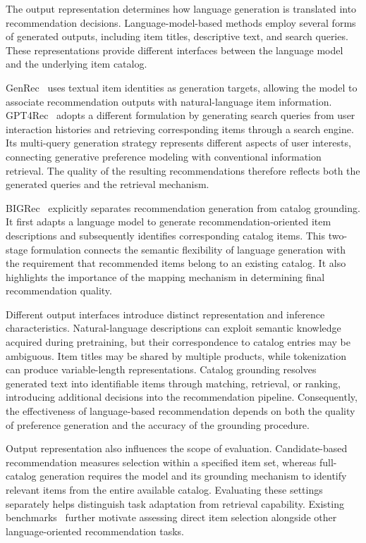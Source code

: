 \documentclass[sigconf,nonacm]{acmart}
\begin{document}
The output representation determines how language generation
is translated into recommendation decisions. Language-model-based
methods employ several forms of generated outputs, including
item titles, descriptive text, and search queries. These
representations provide different interfaces between the
language model and the underlying item catalog.

GenRec~\cite{genrec} uses textual item identities as generation
targets, allowing the model to associate recommendation outputs
with natural-language item information. GPT4Rec~\cite{gpt4rec}
adopts a different formulation by generating search queries
from user interaction histories and retrieving corresponding
items through a search engine. Its multi-query generation
strategy represents different aspects of user interests,
connecting generative preference modeling with conventional
information retrieval. The quality of the resulting
recommendations therefore reflects both the generated queries
and the retrieval mechanism.

BIGRec~\cite{bigrec} explicitly separates recommendation
generation from catalog grounding. It first adapts a language
model to generate recommendation-oriented item descriptions
and subsequently identifies corresponding catalog items.
This two-stage formulation connects the semantic flexibility
of language generation with the requirement that recommended
items belong to an existing catalog. It also highlights the
importance of the mapping mechanism in determining final
recommendation quality.

Different output interfaces introduce distinct representation
and inference characteristics. Natural-language descriptions
can exploit semantic knowledge acquired during pretraining,
but their correspondence to catalog entries may be ambiguous.
Item titles may be shared by multiple products, while
tokenization can produce variable-length representations.
Catalog grounding resolves generated text into identifiable
items through matching, retrieval, or ranking, introducing
additional decisions into the recommendation pipeline.
Consequently, the effectiveness of language-based recommendation
depends on both the quality of preference generation and the
accuracy of the grounding procedure.

Output representation also influences the scope of evaluation.
Candidate-based recommendation measures selection within a
specified item set, whereas full-catalog generation requires
the model and its grounding mechanism to identify relevant
items from the entire available catalog. Evaluating these
settings separately helps distinguish task adaptation from
retrieval capability. Existing benchmarks~\cite{llmbench}
further motivate assessing direct item selection alongside
other language-oriented recommendation tasks.
\end{document}

